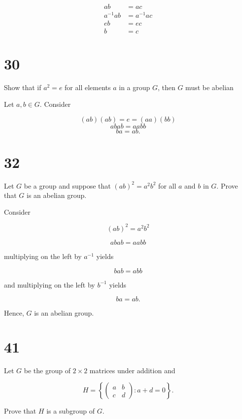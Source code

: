 \documentclass[a4paper]{article}
\begin{document}
\begin{align*}
ab &= ac \\
a^{-1}ab &= a^{-1}ac \\
eb &= ec \\
b &= c
\end{align*}


\section*{30}

Show that if $a^2 = e$ for all elements $a$ in a group $G$, then $G$ must be abelian

\vspace{\baselineskip}

Let $a,b \in G$. Consider

$$(ab)(ab) = e = (aa)(bb)$$
$$abab = aabb$$
$$ ba = ab.$$


\section*{32}

Let $G$ be a group and suppose that $(ab)^2 = a^2b^2$ for all $a$ and $b$ in $G$. Prove that $G$ is an abelian group.

\vspace{\baselineskip}

Consider

$$(ab)^2 = a^2b^2$$

$$abab = aa bb$$

multiplying on the left by $a^{-1}$ yields

$$bab = abb$$

and multiplying on the left by $b^{-1}$ yields

$$ba = ab.$$

Hence, $G$ is an abelian group.


\section*{41}

Let $G$ be the group of $2 \times 2$ matrices under addition and 

$$ H = \left\{
  \begin{pmatrix}
    a & b \\
    c & d
  \end{pmatrix} : a + d = 0\right\}.
$$

Prove that $H$ is a subgroup of $G$.

\vspace{\baselineskip}
\end{document}
